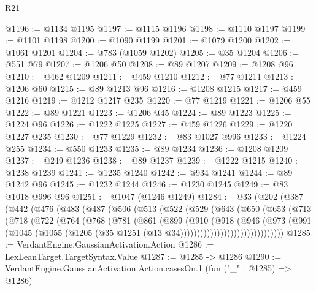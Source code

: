 \begin{lexlean}{R21}
\begin{coremodule}
@1196 := @1134 @1195
@1197 := @1115 @1196
@1198 := @1110 @1197
@1199 := @1101 @1198
@1200 := @1090 @1199
@1201 := @1079 @1200
@1202 := @1061 @1201
@1204 := @783 (@1059 @1202)
@1205 := @35 @1204
@1206 := @551 @79
@1207 := @1206 @50
@1208 := @89 @1207
@1209 := @1208 @96
@1210 := @462 @1209
@1211 := @459 @1210
@1212 := @77 @1211
@1213 := @1206 @60
@1215 := @89 @1213 @96
@1216 := @1208 @1215
@1217 := @459 @1216
@1219 := @1212 @1217 @235
@1220 := @77 @1219
@1221 := @1206 @55
@1222 := @89 @1221
@1223 := @1206 @45
@1224 := @89 @1223
@1225 := @1224 @96
@1226 := @1222 @1225
@1227 := @459 @1226
@1229 := @1220 @1227 @235
@1230 := @77 @1229
@1232 := @83 @1027 @996
@1233 := @1224 @255
@1234 := @550 @1233
@1235 := @89 @1234
@1236 := @1208 @1209
@1237 := @249 @1236
@1238 := @89 @1237
@1239 := @1222 @1215
@1240 := @1238 @1239
@1241 := @1235 @1240
@1242 := @934 @1241
@1244 := @89 @1242 @96
@1245 := @1232 @1244
@1246 := @1230 @1245
@1249 := @83 @1018 @996 @96
@1251 := @1047 (@1246 @1249)
@1284 := @33
    (@202
      (@387
        (@442
          (@476
            (@483
              (@487
                (@506
                  (@513
                    (@522
                      (@529
                        (@643
                          (@650
                            (@653
                              (@713
                                (@718
                                  (@722
                                    (@764
                                      (@768
                                        (@781
                                          (@861
                                            (@899
                                              (@910
                                                (@918
                                                  (@946
                                                    (@973
                                                      (@991
                                                        (@1045
                                                          (@1055
                                                            (@1205
                                                              (@35
                                                                @1251
                                                                (@13
                                                                  @34)))))))))))))))))))))))))))))))
@1285 := VerdantEngine.GaussianActivation.Action
@1286 := LexLeanTarget.TargetSyntax.Value
@1287 := @1285 -> @1286
@1290 := VerdantEngine.GaussianActivation.Action.casesOn.{1} (fun ("_" : @1285) => @1286)

\end{coremodule}
\end{lexlean}
